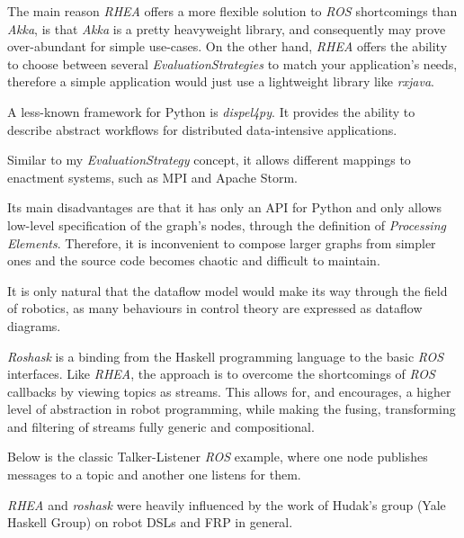 \documentclass{dithesis}
\begin{document}

The main reason \textit{RHEA} offers a more flexible solution to \textit{ROS} shortcomings than \textit{Akka}, is that \textit{Akka} is a pretty heavyweight library, and consequently may prove over-abundant for simple use-cases. On the other hand, \textit{RHEA} offers the ability to choose between several \textit{EvaluationStrategies} to match your application's needs, therefore a simple application would just use a lightweight library like \textit{rxjava}.


A less-known framework for Python is \textit{dispel4py}\cite{dispel}. It provides the ability to describe abstract workflows for distributed data-intensive applications.

Similar to my \textit{EvaluationStrategy} concept, it allows different mappings to enactment systems, such as MPI\cite{mpi} and Apache Storm\cite{storm}.

Its main disadvantages are that it has only an API for Python and only allows low-level specification of the graph's nodes, through the definition of \textit{Processing Elements}. Therefore, it is inconvenient to compose larger graphs from simpler ones and the source code becomes chaotic and difficult to maintain.


It is only natural that the dataflow model would make its way through the field of robotics, as many behaviours in control theory are expressed as dataflow diagrams. 


\textit{Roshask}\cite{roshask} is a binding from the Haskell programming language to the basic \textit{ROS} interfaces. Like \textit{RHEA}, the approach is to overcome the shortcomings of \textit{ROS} callbacks by viewing topics as streams. This allows for, and encourages, a higher level of abstraction in robot programming, while making the fusing, transforming and filtering of streams fully generic and compositional. 

Below is the classic Talker-Listener \textit{ROS} example, where one node publishes messages to a topic and another one listens for them.



\textit{RHEA} and \textit{roshask} were heavily influenced by the work of Hudak's group (Yale Haskell Group) on robot DSLs and FRP in general\cite{fran, arrows_robots,lambda_in_motion,event_frp,real_frp,pushpull_frp}.
\end{document}
